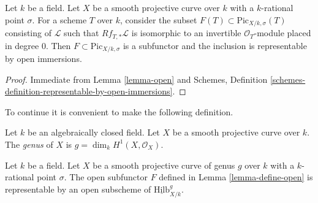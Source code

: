 \begin{lemma}
\label{lemma-define-open}
Let $k$ be a field. Let $X$ be a smooth projective curve over $k$
with a $k$-rational point $\sigma$. For a scheme $T$ over $k$,
consider the subset $F(T) \subset \text{Pic}_{X/k, \sigma}(T)$ consisting of
$\mathcal{L}$ such that $Rf_{T, *}\mathcal{L}$ is isomorphic to an invertible
$\mathcal{O}_T$-module placed in degree $0$. Then
$F \subset \text{Pic}_{X/k, \sigma}$ is a subfunctor and the inclusion is
representable by open immersions.
\end{lemma}

\begin{proof}
Immediate from Lemma \ref{lemma-open} and
Schemes, Definition \ref{schemes-definition-representable-by-open-immersions}.
\end{proof}

\noindent
To continue it is convenient to make the following definition.

\begin{definition}
\label{definition-genus}
Let $k$ be an algebraically closed field. Let $X$ be a smooth projective
curve over $k$. The {\it genus} of $X$ is $g = \dim_k H^1(X, \mathcal{O}_X)$.
\end{definition}

\begin{lemma}
\label{lemma-open-representable}
Let $k$ be a field. Let $X$ be a smooth projective curve of genus $g$
over $k$ with a $k$-rational point $\sigma$. The open subfunctor $F$ defined
in Lemma \ref{lemma-define-open} is representable by an open subscheme of
$\underline{\text{Hilb}}^g_{X/k}$.
\end{lemma}

